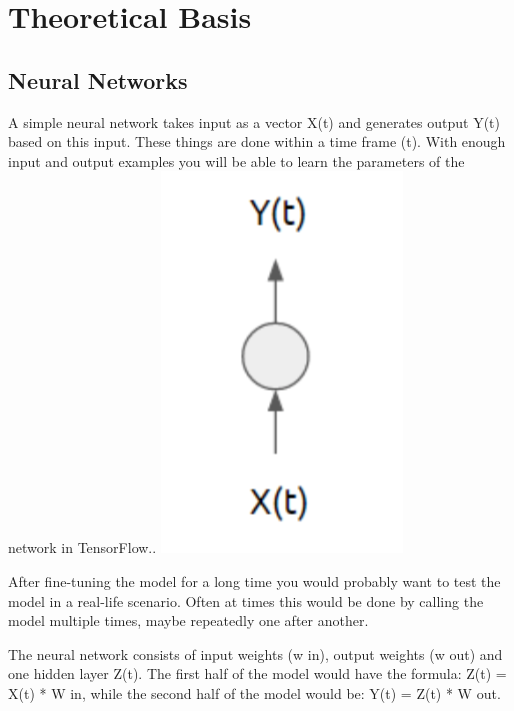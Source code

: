 \documentclass[english, a4paper]{report}
\begin{document}
\chapter{Theoretical Basis}
{
    \section{Neural Networks}\label{neural networks}
    {
        A simple neural network takes input as a vector X(t) and generates output Y(t) based on this input. These things are done within a time frame (t). With enough input and output examples you will be able to learn the parameters of the network in TensorFlow.\cite{}. \includegraphics{NNimg1}
        \par
        After fine-tuning the model for a long time you would probably want to test the model in a real-life scenario. Often at times this would be done by calling the model multiple times, maybe repeatedly one after another.
        \par
        The neural network consists of input weights (w in), output weights (w out) and one hidden layer Z(t). The first half of the model would have the formula: Z(t) = X(t) * W in, while the second half of the model would be: Y(t) = Z(t) * W out. 
        
}}
\end{document}
